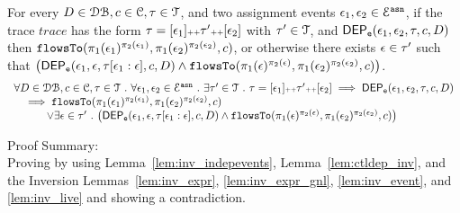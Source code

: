 \begin{lem}
	\label{lem:depevents_exist}
For every $D \in \mathcal{DB} , c \in \mathcal{C}, \mathtt{\tau} \in \mathcal{T}$, and two assignment events 
$\mathtt{\epsilon}_1, \mathtt{\epsilon}_2 \in \mathcal{E}^{\mathtt{{asn}}}$,
if the trace $trace$ has the form $\mathtt{\tau} = [\mathtt{\epsilon}_1] {\scriptscriptstyle ++} \mathtt{\tau}' {\scriptscriptstyle ++} [\mathtt{\epsilon}_2]$ with $\mathtt{\tau}' \in \mathcal{T}$, and $\mathsf{DEP_{\mathtt{e}}}(\mathtt{\epsilon}_1, \mathtt{\epsilon}_2, \mathtt{\tau}, c, D)$
then $\mathtt{flowsTo}(\pi_1(\mathtt{\epsilon}_1)^{\pi_2(\mathtt{\epsilon}_1)}, \pi_1(\mathtt{\epsilon}_2)^{\pi_2(\mathtt{\epsilon}_2)}, c) $,
or otherwise there exists
$\mathtt{\epsilon} \in \mathtt{\tau}'$ such that
$\left( 		
   \eventdep(\event_1, \event, \trace[\event_1:\event], c, D)
\land 
\flowsto(\pi_1(\event)^{\pi_2(\event)}, \pi_1(\event_2)^{\pi_2(\event_2)}, c) 
\right)$.
%
	\[
	\begin{array}{l}
		\forall D \in \dbdom , c \in \cdom, \trace \in \mathcal{T} \st \forall \event_1, \event_2 \in \eventset^{\asn} \st
		 \exists \trace' \in \mathcal{T} \st \trace = [\event_1] \tracecat \trace' \tracecat [\event_2]
		\implies
		\eventdep(\event_1, \event_2, \trace, c, D) 
		\\ \quad 
		\implies 
		\flowsto(\pi_1(\event_1)^{\pi_2(\event_1)}, \pi_1(\event_2)^{\pi_2(\event_2)}, c) 
		\\ \qquad \quad \lor
		\exists \event \in \trace' \st 
		\left( 		
			\eventdep(\event_1, \event, \trace[\event_1:\event], c, D)
		\land 
		\flowsto(\pi_1(\event)^{\pi_2(\event)}, \pi_1(\event_2)^{\pi_2(\event_2)}, c) 
	\right) 
	\end{array}
	\]
\end{lem}
Proof Summary: 
\\
Proving by using Lemma~\ref{lem:inv_indepevents}, Lemma~\ref{lem:ctldep_inv}, and the Inversion Lemmas~\ref{lem:inv_expr}, \ref{lem:inv_expr_gnl},
\ref{lem:inv_event}, and \ref{lem:inv_live}
and showing a contradiction.
